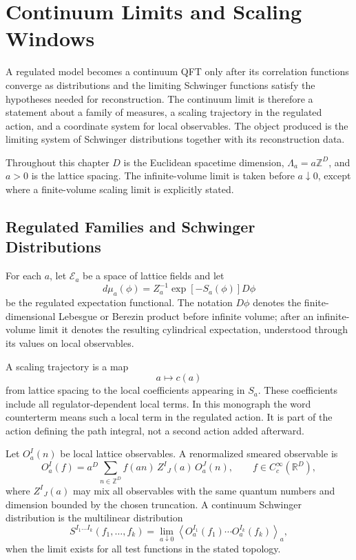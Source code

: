 \chapter{Continuum Limits and Scaling Windows}
\label{ch:constructive-continuum-limits-scaling-windows}

\ConventionsEuclidean

A regulated model becomes a continuum QFT only after its correlation
functions converge as distributions and the limiting Schwinger functions
satisfy the hypotheses needed for reconstruction.  The continuum limit is
therefore a statement about a family of measures, a scaling trajectory in
the regulated action, and a coordinate system for local observables.  The
object produced is the limiting system of Schwinger distributions together
with its reconstruction data.

Throughout this chapter \(D\) is the Euclidean spacetime dimension,
\(\Lambda_a=a\mathbb Z^D\), and \(a>0\) is the lattice spacing.  The
infinite-volume limit is taken before \(a\downarrow0\), except where a
finite-volume scaling limit is explicitly stated.

\section{Regulated Families and Schwinger Distributions}

For each \(a\), let \(\mathcal E_a\) be a space of lattice fields and let
\[
  d\mu_a(\phi)=Z_a^{-1}\exp[-S_a(\phi)]D\phi
\]
be the regulated expectation functional.  The notation \(D\phi\) denotes the
finite-dimensional Lebesgue or Berezin product before infinite volume; after
an infinite-volume limit it denotes the resulting cylindrical expectation,
understood through its values on local observables.

A scaling trajectory is a map
\[
  a\longmapsto c(a)
\]
from lattice spacing to the local coefficients appearing in \(S_a\).  These
coefficients include all regulator-dependent local terms.  In this
monograph the word counterterm means such a local term in the regulated
action.  It is part of the action defining the path integral, not a second
action added afterward.

Let \(O^I_a(n)\) be local lattice observables.  A renormalized smeared
observable is
\begin{equation}
  O^I_a(f)
  =
  a^D\sum_{n\in\mathbb Z^D}
  f(an)\,Z^I{}_J(a)\,O^J_a(n),
  \qquad f\in C_c^\infty(\mathbb R^D),
  \label{eq:continuum-limit-renormalized-smeared-observable}
\end{equation}
where \(Z^I{}_J(a)\) may mix all observables with the same quantum numbers
and dimension bounded by the chosen truncation.  A continuum Schwinger
distribution is the multilinear distribution
\begin{equation}
  S^{I_1\ldots I_k}(f_1,\ldots,f_k)
  =
  \lim_{a\downarrow0}
  \left\langle
    O^{I_1}_a(f_1)\cdots O^{I_k}_a(f_k)
  \right\rangle_a ,
  \label{eq:continuum-limit-schwinger-distribution}
\end{equation}
when the limit exists for all test functions in the stated topology.

